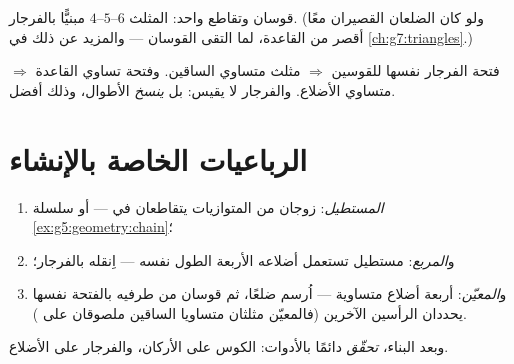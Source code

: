 \begin{omfigure}

{\small قوسان وتقاطع واحد: المثلث $6$--$5$--$4$ مبنيًّا
بالفرجار. (ولو كان الضلعان القصيران معًا أقصر من
القاعدة، لما التقى القوسان --- والمزيد عن ذلك في
\cref{ch:g7:triangles}.)}
\end{omfigure}

\begin{example}\label{ex:g5:geometry:special}
فتحة الفرجار نفسها للقوسين $\Rightarrow$ مثلث متساوي الساقين.
وفتحة تساوي القاعدة $\Rightarrow$ متساوي الأضلاع. والفرجار
لا يقيس: بل \emph{ينسخ} الأطوال، وذلك أفضل.
\end{example}

\section{الرباعيات الخاصة بالإنشاء}

\begin{method}\label{met:g5:geometry:quadrilaterals}
\begin{enumerate}
  \item \emph{المستطيل}: زوجان من المتوازيات يتقاطعان في  --- أو سلسلة \cref{ex:g5:geometry:chain}؛
  \item و\emph{المربع}: مستطيل تستعمل أضلاعه الأربعة الطول
        نفسه --- اِنقله بالفرجار؛
  \item و\emph{المعيّن}: أربعة أضلاع متساوية --- اُرسم ضلعًا، ثم
        قوسان من طرفيه بالفتحة نفسها يحددان الرأسين
        الآخرين (فالمعيّن مثلثان متساويا الساقين ملصوقان على
        ).
\end{enumerate}
وبعد البناء، \emph{تحقّق} دائمًا بالأدوات: الكوس على
الأركان، والفرجار على الأضلاع.
\end{method}

